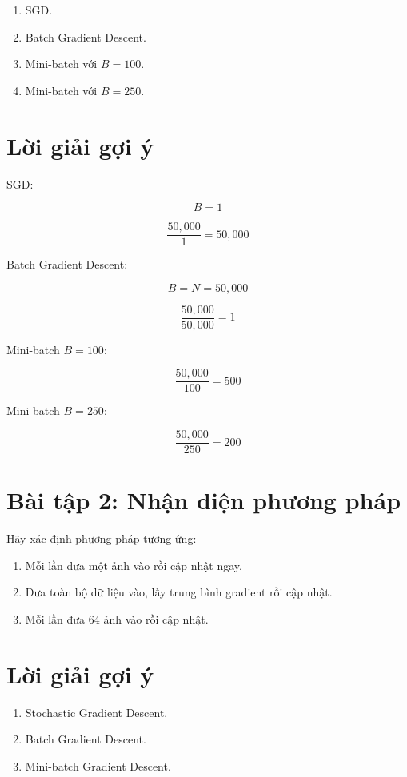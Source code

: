 \documentclass[12pt,a4paper]{report}
\begin{document}
\begin{enumerate}
    \item SGD.
    \item Batch Gradient Descent.
    \item Mini-batch với $B=100$.
    \item Mini-batch với $B=250$.
\end{enumerate}

\section*{Lời giải gợi ý}

SGD:

\[
    B=1
\]

\[
    \frac{50,000}{1}=50,000
\]

Batch Gradient Descent:

\[
    B=N=50,000
\]

\[
    \frac{50,000}{50,000}=1
\]

Mini-batch $B=100$:

\[
    \frac{50,000}{100}=500
\]

Mini-batch $B=250$:

\[
    \frac{50,000}{250}=200
\]

\section*{Bài tập 2: Nhận diện phương pháp}

Hãy xác định phương pháp tương ứng:

\begin{enumerate}
    \item Mỗi lần đưa một ảnh vào rồi cập nhật ngay.
    \item Đưa toàn bộ dữ liệu vào, lấy trung bình gradient rồi cập nhật.
    \item Mỗi lần đưa 64 ảnh vào rồi cập nhật.
\end{enumerate}

\section*{Lời giải gợi ý}

\begin{enumerate}
    \item Stochastic Gradient Descent.
    \item Batch Gradient Descent.
    \item Mini-batch Gradient Descent.
\end{enumerate}
\end{document}

